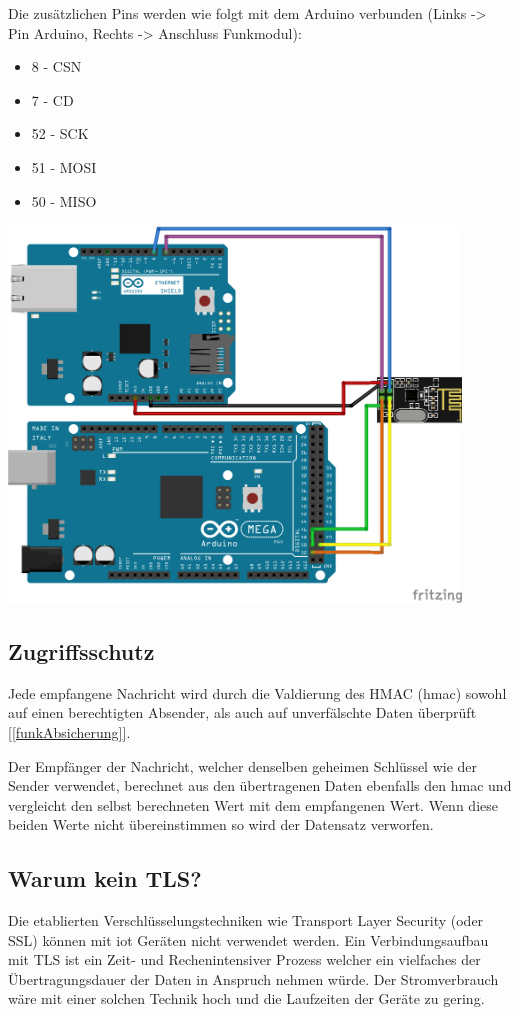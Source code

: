 \documentclass[
  12pt, %
  a4paper, %
  oneside, %
  openany, 
  numbers=noenddot, %
  BCOR=5mm, %
  parskip=half*, %
  thesis, %
]{bfhbook}
\begin{document}
Die zusätzlichen Pins werden wie folgt mit dem Arduino verbunden (Links -> Pin Arduino, Rechts -> Anschluss Funkmodul):
\begin{itemize}[noitemsep,topsep=0pt,parsep=0pt,partopsep=0pt]
\item 8 - CSN
\item 7 - CD
\item 52 - SCK
\item 51 -  MOSI
\item 50 - MISO
\end{itemize}
\begin{center}
    \includegraphics[width=12cm, left]{Bilder/MQTT-Gateway-Design_Steckplatine.png}
\end{center}
\subsection{Zugriffsschutz}
Jede empfangene Nachricht wird durch die Valdierung des HMAC (\Gls{hmac}) sowohl auf einen berechtigten Absender, als auch auf unverfälschte Daten überprüft [\ref{funkAbsicherung}].

Der Empfänger der Nachricht, welcher denselben geheimen Schlüssel wie der Sender verwendet, berechnet aus den übertragenen Daten ebenfalls den \Gls{hmac} und vergleicht den selbst berechneten Wert mit dem empfangenen Wert. Wenn diese beiden Werte nicht übereinstimmen so wird der Datensatz verworfen.
\subsection{Warum kein TLS?}
Die etablierten Verschlüsselungstechniken wie Transport Layer Security (oder SSL) können mit \Gls{iot} Geräten nicht verwendet werden. Ein Verbindungsaufbau mit TLS ist ein Zeit- und Rechenintensiver Prozess welcher ein vielfaches der Übertragungsdauer der Daten in Anspruch nehmen würde. Der Stromverbrauch wäre mit einer solchen Technik hoch und die Laufzeiten der Geräte zu gering.
\end{document}

